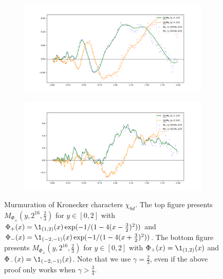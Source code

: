 \begin{figure}[htp] 
\centering
    \begin{subfigure}{1.0\textwidth}
        \centering
        \includegraphics[width=\textwidth]{src/lop_fig2.png}%
        \label{fig:lop_fig2}
    \end{subfigure}
    
    \begin{subfigure}{1.0\textwidth}
        \centering
        \includegraphics[width=\textwidth]{src/lop_fig3.png}%
        \label{fig:lop_fig3}
    \end{subfigure}

    \caption{Murmuration of Kronecker characters $\chi_{8d}$. The top figure presents $M_{\Phi_{\pm}}(y, 2^{16}, \frac{2}{3})$ for $y \in [0, 2]$ with $\Phi_+(x) = \1_{(1, 2)}(x) \exp(-1/(1 - 4(x - \frac{3}{2})^2))$ and $\Phi_-(x) = \1_{(-2, -1)}(x) \exp(-1/(1 - 4(x + \frac{3}{2})^2))$. The bottom figure presents $M_{\Phi_{\pm}}(y, 2^{16}, \frac{2}{3})$ for $y \in [0, 2]$ with $\Phi_+(x) = \1_{(1, 2)}(x)$ and $\Phi_-(x) = \1_{(-2, -1)}(x)$. Note that we use $\gamma = \frac{2}{3}$, even if the above proof only works when $\gamma > \frac{3}{4}$.}
\label{fig:lop_quad}
\end{figure}